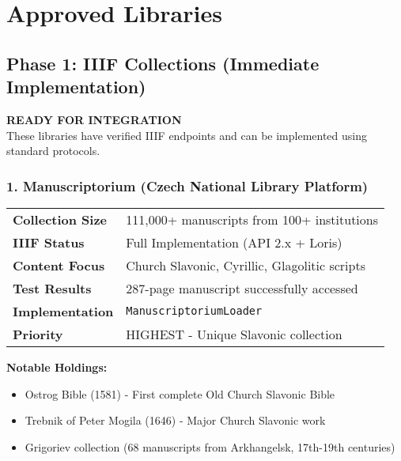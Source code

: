 \documentclass[11pt,a4paper]{article}
\begin{document}
\section{Approved Libraries}

\subsection{Phase 1: IIIF Collections (Immediate Implementation)}

\begin{successbox}
\textbf{\faCheckCircle{} READY FOR INTEGRATION}\\
These libraries have verified IIIF endpoints and can be implemented using standard protocols.
\end{successbox}

\subsubsection{1. Manuscriptorium (Czech National Library Platform)}

\begin{tabularx}{\textwidth}{lX}
\toprule
\textbf{Collection Size} & 111,000+ manuscripts from 100+ institutions \\
\textbf{IIIF Status} & \textcolor{success}{\faBolt{} Full Implementation} (API 2.x + Loris) \\
\textbf{Content Focus} & Church Slavonic, Cyrillic, Glagolitic scripts \\
\textbf{Test Results} & 287-page manuscript successfully accessed \\
\textbf{Implementation} & \texttt{ManuscriptoriumLoader} \\
\textbf{Priority} & \textcolor{success}{\faStar{} HIGHEST} - Unique Slavonic collection \\
\bottomrule
\end{tabularx}

\vspace{0.5cm}

\textbf{Notable Holdings:}
\begin{itemize}[leftmargin=*,noitemsep]
    \item Ostrog Bible (1581) - First complete Old Church Slavonic Bible
    \item Trebnik of Peter Mogila (1646) - Major Church Slavonic work
    \item Grigoriev collection (68 manuscripts from Arkhangelsk, 17th-19th centuries)
\end{itemize}
\end{document}

